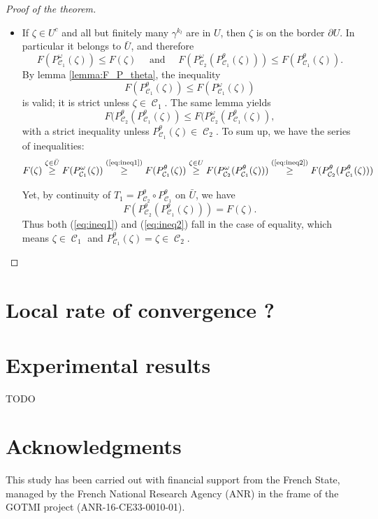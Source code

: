 \documentclass{article} %
\DeclareMathOperator{\Ccal}{\mathcal{C}}
\theoremstyle{plain}
\theoremstyle{definition}
\theoremstyle{remark}
\begin{document}
\begin{proof}[Proof of the theorem]
\begin{itemize}
		 \item If $\zeta \in U^c$ and all but finitely many $\gamma^{k_l}$ are in $U$, then $\zeta$ is on the border $\partial U$. In particular it belongs to $\bar{U}$, and therefore
		 \[
		 F(P^\omega_{\Ccal_1}(\zeta)) \le F(\zeta) \quad
		 \text{ and } \quad
		 F(P^\omega_{\Ccal_2}(P^\theta_{\Ccal_1}(\zeta))) \le F(P^\theta_{\Ccal_1}(\zeta)).
		 \]
		 By lemma \ref{lemma:F_P_theta}, the inequality \begin{equation} \label{eq:ineq1}
		 F(P_{\Ccal_1}^\theta(\zeta)) \le F(P_{\Ccal_1}^\omega(\zeta)) \end{equation}
		 is valid; it is strict unless $\zeta \in \Ccal_1$.
		 The same lemma yields
		 \begin{equation} \label{eq:ineq2}
		 F(P_{\Ccal_2}^\theta(P_{\Ccal_1}^\theta(\zeta)) \le F(P_{\Ccal_2}^\omega(P_{\Ccal_1}^\theta(\zeta)), \end{equation}
		 with a strict inequality unless $P_{\Ccal_1}^\theta(\zeta) \in \Ccal_2$.
		 To sum up, we have the series of inequalities:
		 \[
		 F(\zeta) 
		 \overset{\zeta \in \bar{U}}{\ge}
		 F(P^\omega_{\Ccal_1}(\zeta))
		 \overset{\text{(\ref{eq:ineq1})}}{\ge}
		 F(P^\theta_{\Ccal_1}(\zeta))
		 \overset{\zeta \in U}{\ge}
		 F(P_{\Ccal_2}^\omega(P_{\Ccal_1}^\theta(\zeta)))
		 \overset{\text{(\ref{eq:ineq2})}}{\ge}
		 F(P_{\Ccal_2}^\theta(P_{\Ccal_1}^\theta(\zeta)))
		 \]
		 
		 Yet, by continuity of $T_1 = P_{\Ccal_2}^\theta \circ P_{\Ccal_1}^\theta $ on $\bar{U}$, we have
		 \[
		 F(P_{\Ccal_2}^\theta(P_{\Ccal_1}^\theta(\zeta))) = F(\zeta).
		 \]
		 Thus both (\ref{eq:ineq1}) and (\ref{eq:ineq2}) fall in the case of equality, which means $\zeta \in \Ccal_1$ and $P^\theta_{\Ccal_1}(\zeta) = \zeta \in \Ccal_2$.
	\end{itemize}
\end{proof}


\section{Local rate of convergence ?}

\section{Experimental results}
{\color{red} TODO}


\section*{Acknowledgments}
This study has been carried out with financial support from the French State, managed by the French National Research Agency (ANR) in the frame of the  GOTMI project (ANR-16-CE33-0010-01).




\end{document}
